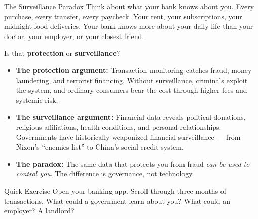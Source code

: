 \begin{frame}{The Surveillance Paradox}
  Think about what your bank knows about you. Every purchase, every transfer,
  every paycheck. Your rent, your subscriptions, your midnight food deliveries.
  \textcolor{mlpurple}{Your bank knows more about your daily life than your
  doctor, your employer, or your closest friend.}

  \vspace{0.5em}
  Is that \textbf{protection} or \textbf{surveillance}?

  \vspace{0.3em}
  \begin{itemize}
    \item \textcolor{mlpurple}{\textbf{The protection argument:}} Transaction
          monitoring catches fraud, money laundering, and terrorist financing.
          Without surveillance, criminals exploit the system, and ordinary
          consumers bear the cost through higher fees and systemic risk.
    \item \textcolor{mlpurple}{\textbf{The surveillance argument:}} Financial
          data reveals political donations, religious affiliations, health
          conditions, and personal relationships. Governments have historically
          weaponized financial surveillance --- from Nixon's ``enemies list'' to
          China's social credit system.
    \item \textcolor{mlpurple}{\textbf{The paradox:}} The same data that
          protects you from fraud \textit{can be used to control you}. The
          difference is governance, not technology.
  \end{itemize}

  \vspace{0.3em}
  \begin{exampleblock}{Quick Exercise}
    Open your banking app. Scroll through three months of transactions. What
    could a government learn about you? What could an employer? A landlord?
  \end{exampleblock}
\end{frame}


